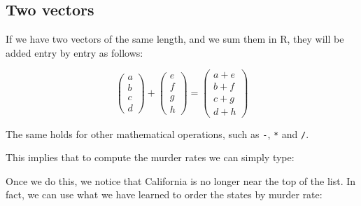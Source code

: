 \documentclass[
]{krantz}
\newenvironment{Shaded}{\begin{snugshade}}{\end{snugshade}}
\newcommand{\CommentTok}[1]{\textcolor[rgb]{0.37,0.37,0.37}{\textit{#1}}}
\newcommand{\DecValTok}[1]{\textcolor[rgb]{0.06,0.06,0.06}{#1}}
\newcommand{\NormalTok}[1]{#1}
\newcommand{\OperatorTok}[1]{\textcolor[rgb]{0.43,0.43,0.43}{\textbf{#1}}}
\newcommand{\StringTok}[1]{\textcolor[rgb]{0.5,0.5,0.5}{#1}}
\begin{document}
\hypertarget{two-vectors}{%
\subsection{Two vectors}\label{two-vectors}}

If we have two vectors of the same length, and we sum them in R, they will be added entry by entry as follows:

\[
\begin{pmatrix}
a\\
b\\
c\\
d
\end{pmatrix}
+
\begin{pmatrix}
e\\
f\\
g\\
h
\end{pmatrix}
=
\begin{pmatrix}
a +e\\
b + f\\
c + g\\
d + h
\end{pmatrix}
\]

The same holds for other mathematical operations, such as \texttt{-}, \texttt{*} and \texttt{/}.

This implies that to compute the murder rates we can simply type:

\begin{Shaded}
\end{Shaded}

Once we do this, we notice that California is no longer near the top of the list. In fact, we can use what we have learned to order the states by murder rate:
\end{document}
